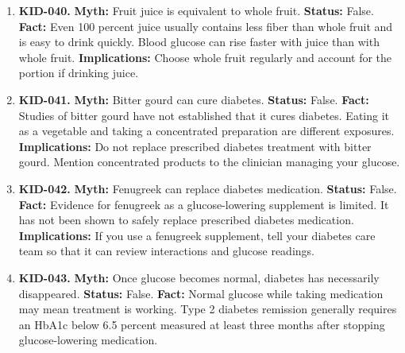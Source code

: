 \documentclass[11pt,oneside]{book}
\begin{document}
\begin{enumerate}[leftmargin=0pt,labelwidth=0pt,labelsep=0pt,itemindent=0pt]
\textbf{Status:} False.\newline
\textbf{Fact:} Dates contain carbohydrate, including sugars. Their effect on blood glucose depends partly on the number and size eaten and on the rest of the meal. \cite{ref357}\newline
\textbf{Implications:} Include the portion of dates when estimating carbohydrate. A large date can contain considerably more than a small one.
\item[] \textbf{KID-040.} \textbf{Myth:} Fruit juice is equivalent to whole fruit.\newline
\textbf{Status:} False.\newline
\textbf{Fact:} Even 100 percent juice usually contains less fiber than whole fruit and is easy to drink quickly. Blood glucose can rise faster with juice than with whole fruit. \cite{ref357}\newline
\textbf{Implications:} Choose whole fruit regularly and account for the portion if drinking juice.
\item[] \textbf{KID-041.} \textbf{Myth:} Bitter gourd can cure diabetes.\newline
\textbf{Status:} False.\newline
\textbf{Fact:} Studies of bitter gourd have not established that it cures diabetes. Eating it as a vegetable and taking a concentrated preparation are different exposures. \cite{ref81}\newline
\textbf{Implications:} Do not replace prescribed diabetes treatment with bitter gourd. Mention concentrated products to the clinician managing your glucose.
\item[] \textbf{KID-042.} \textbf{Myth:} Fenugreek can replace diabetes medication.\newline
\textbf{Status:} False.\newline
\textbf{Fact:} Evidence for fenugreek as a glucose-lowering supplement is limited. It has not been shown to safely replace prescribed diabetes medication. \cite{ref81}\newline
\textbf{Implications:} If you use a fenugreek supplement, tell your diabetes care team so that it can review interactions and glucose readings.
\item[] \textbf{KID-043.} \textbf{Myth:} Once glucose becomes normal, diabetes has necessarily disappeared.\newline
\textbf{Status:} False.\newline
\textbf{Fact:} Normal glucose while taking medication may mean treatment is working. Type 2 diabetes remission generally requires an HbA1c below 6.5 percent measured at least three months after stopping glucose-lowering medication. \cite{ref358}\newline

\end{enumerate}
\end{document}
